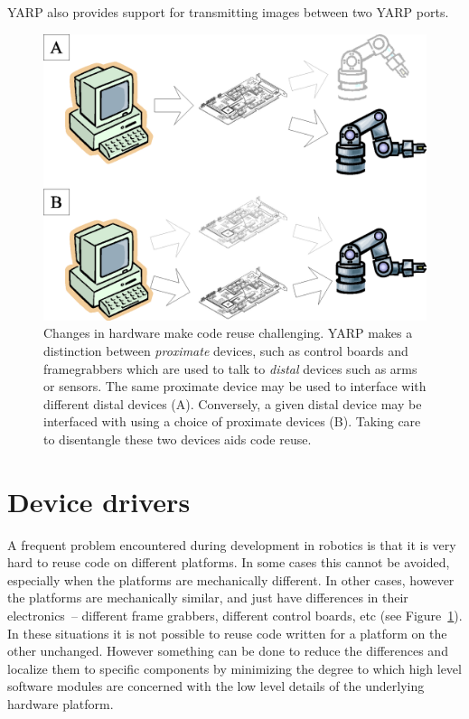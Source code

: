 YARP also provides support for transmitting images between two YARP
ports.


\begin{figure}[t]
\centerline{\includegraphics[width=\columnwidth]{fig-devices}}
\caption{
Changes in hardware make code reuse challenging.
YARP makes a distinction between {\em proximate} devices,
such as control boards and framegrabbers which are used to
talk to {\em distal} devices such as arms or sensors.  The 
same proximate device may be used to interface with different
distal devices (A).   Conversely, a given distal device may be
interfaced with using a choice of proximate devices (B).
Taking care to disentangle these two devices aids code reuse.
}
\label{fig:devices}
\end{figure}

\section{Device drivers}

A frequent problem encountered during development in robotics is that
it is very hard to reuse code on different platforms. In some
cases this cannot be avoided, especially when the platforms are
mechanically different. In other cases, however the platforms are
mechanically similar, and just have differences in their 
electronics~-- different frame grabbers, different
control boards, etc (see Figure~\ref{fig:devices}). 
In these situations it is not possible to reuse code
written for a platform on the other unchanged. 
However something can be done to
reduce the differences and localize them to specific components
by minimizing the degree to which
high level software modules are 
concerned with the low level details of the underlying hardware
platform.

